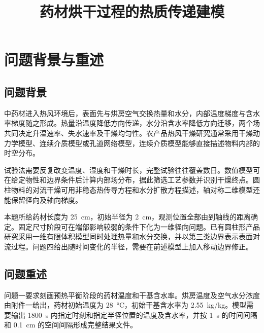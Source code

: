 \documentclass[withoutpreface,bwprint]{cumcmthesis}
\title{药材烘干过程的热质传递建模}
\begin{document}
\maketitle

\begin{abstract}
\vspace*{\fill}
\keywords{}
\end{abstract}


\section{问题背景与重述}

\subsection{问题背景}

中药材进入热风环境后，表面先与烘房空气交换热量和水分，内部温度梯度与含水率梯度随之形成。热量沿温度降低方向传递，水分沿含水率降低方向迁移，两个场共同决定升温速率、失水速率及干燥均匀性。农产品热风干燥研究通常采用干燥动力学模型、连续介质模型或孔道网络模型，连续介质模型能够直接描述物料内部的时空分布\cite{liu2020}。

试验法需要反复改变温度、湿度和干燥时长，完整试验往往覆盖数日。数值模型可在给定物性和边界条件后计算内部场分布，据此筛选工艺参数并识别干燥终点。圆柱物料的对流干燥可用非稳态热传导方程和水分扩散方程描述\cite{tzempelikos2015}，轴对称二维模型还能保留径向及轴向梯度\cite{hussain2003}。

本题所给药材长度为 \SI{25}{cm}，初始半径为 \SI{2}{cm}，观测位置全部由到轴线的距离确定。固定尺寸阶段可在端部影响较弱的条件下化为一维径向问题。已有圆柱形产品研究采用一维有限体积模型同时处理热量和水分交换，并以第三类边界表示表面对流过程\cite{silva2014}。问题四给出随时间变化的半径，需要在前述模型上加入移动边界修正。

\subsection{问题重述}

问题一要求刻画预热平衡阶段的药材温度和干基含水率。烘房温度及空气水分浓度由附件一给出，药材初始温度为 \SI{28}{\degreeCelsius}，初始干基含水率为 \SI{2.55}{kg/kg}。模型需要输出 \SI{1800}{s} 内指定时刻和指定半径位置的温度及含水率，并按 \SI{1}{s} 的时间间隔和 \SI{0.1}{cm} 的空间间隔形成完整结果文件。
\end{document}
